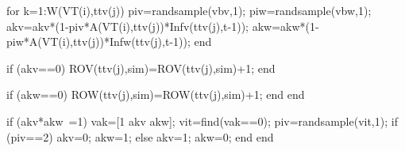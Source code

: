                                                                                 for k=1:W(VT(i),ttv(j))
                                                                                        piv=randsample(vbv,1);
                                                                                        piw=randsample(vbw,1);
                                                                                        akv=akv*(1-piv*A(VT(i),ttv(j))*Infv(ttv(j),t-1));
                                                                                        akw=akw*(1-piw*A(VT(i),ttv(j))*Infw(ttv(j),t-1));                                                                 
                                                                                end
                                                          
                                                         
                                                                                if (akv==0)
                                                                                        ROV(ttv(j),sim)=ROV(ttv(j),sim)+1;
                                                                                end
                                                          
                                                                                if (akw==0)
                                                                                        ROW(ttv(j),sim)=ROW(ttv(j),sim)+1;
                                                                                end
                                                                        end  
                                                     
                                                                        if (akv*akw~=1)                                                                        
                                                                                vak=[1 akv akw];
                                                                                vit=find(vak==0); 
                                                                                piv=randsample(vit,1);
                                                                                if (piv==2)
                                                                                        akv=0;
                                                                                        akw=1;
                                                                                else
                                                                                        akv=1;
                                                                                        akw=0;
                                                                                end                                                                       
                                                                        end
                                          
